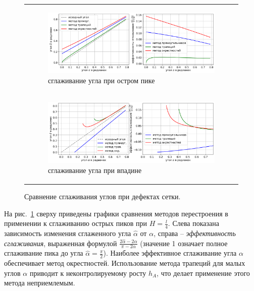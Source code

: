 \documentclass[a4paper,14pt]{extarticle}                     %
\theoremstyle{plain}                                         %
\begin{document}
\begin{figure}[ht]
\centering
\begin{tabular}{l}
\begin{subfigure}{0.9\textwidth}\centering\includegraphics[width=1.0\columnwidth]{fig/2dr_peak_methods_chart_big.png}\caption{сглаживание угла при остром пике}\end{subfigure} \\
\begin{subfigure}{0.9\textwidth}\centering\includegraphics[width=1.0\columnwidth]{fig/2dr_cavern_methods_chart_big.png}\caption{сглаживание угла при впадине}\end{subfigure}
\end{tabular}
\singlespacing
\caption{Сравнение сглаживания углов при дефектах сетки.}
\label{fig:smooth_2d}
\end{figure}

На рис.~\ref{fig:smooth_2d} сверху приведены графики сравнения методов перестроения в применении к сглаживанию острых пиков при $H = \frac{l}{4}$.
Слева показана зависимость изменения сглаженного угла $\hat{\alpha}$ от $\alpha$, справа -- \textit{эффективность сглаживания}, выраженная формулой $\frac{2 \hat{\alpha} - 2 \alpha}{\pi - 2 \alpha}$ (значение 1 означает полное сглаживание пика до угла $\hat{\alpha} = \frac{\pi}{2}$).
Наиболее эффективное сглаживание угла $\alpha$ обеспечивает метод окрестностей.
Использование метода трапеций для малых углов $\alpha$ приводит к неконтролируемому росту $h_A$, что делает применение этого метода неприемлемым.
\end{document}
